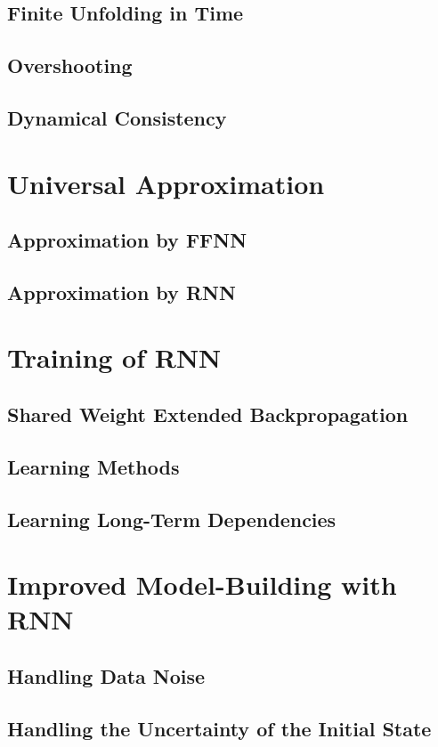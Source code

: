 \documentclass[officiallayout]{tktla}
\begin{document}
\subsection{Finite Unfolding in Time}
\subsection{Overshooting}
\subsection{Dynamical Consistency}
\section{Universal Approximation}
\subsection{Approximation by FFNN}

\subsection{Approximation by RNN}
\section{Training of RNN}
\subsection{Shared Weight Extended Backpropagation}
\subsection{Learning Methods}
\subsection{Learning Long-Term Dependencies}

\section{Improved Model-Building with RNN} 
\subsection{Handling Data Noise} 
\subsection{Handling the Uncertainty of the Initial State}
\end{document}
